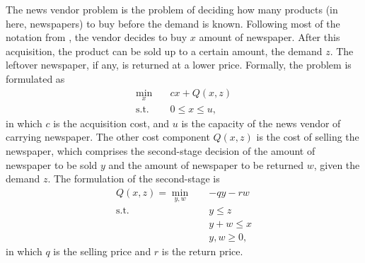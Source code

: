 \documentclass[twoside,11pt]{article}
\begin{document}
The news vendor problem is the problem of deciding how many products (in here, newspapers) to buy before the demand is known.
Following most of the notation from \citet{birgeIntroductionStochasticProgramming2011}, the vendor decides to buy $x$ amount of newspaper. 
After this acquisition, the product can be sold up to a certain amount, the demand $z$.
The leftover newspaper, if any, is returned at a lower price.
Formally, the problem is formulated as
\begin{equation}\label{eq:deterministic-2sp-ul}
\begin{split}
    \min_{x} \quad & c x + Q(x,z) \\
    \textrm{s.t.} \quad & 0\le x\le u
,\end{split}
\end{equation}
in which $c$ is the acquisition cost, and $u$ is the capacity of the news vendor of carrying newspaper.
The other cost component $Q(x,z)$ is the cost of selling the newspaper, which comprises the second-stage decision of the amount of newspaper to be sold $y$ and the amount of newspaper to be returned $w$, given the demand $z$.
The formulation of the second-stage is
\begin{equation}\label{eq:deterministic-2sp-ll}
\begin{split}
    Q(x,z) = \min_{y,w} \quad & -q y - r w \\
    \textrm{s.t.} \quad & y\le z \\
      & y+w \le x \\
      & y,w \ge 0
,\end{split}
\end{equation}
in which $q$ is the selling price and $r$ is the return price.


\end{document}
